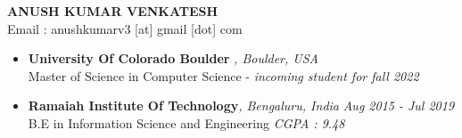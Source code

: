 \documentclass[11pt,a4paper]{article}
\begin{document}
\begin{center}
    \textbf{\huge ANUSH KUMAR VENKATESH}
    \\ Email : anushkumarv3 [at] gmail [dot] com
\end{center}
\colorbox{gray}{}
\vspace{-20pt}
  \begin{itemize}
      \item \textbf{University Of Colorado Boulder} \emph{, Boulder, USA}
      \\ Master of Science in Computer Science - \emph{incoming student for fall 2022}
  \end{itemize}
  \begin{itemize}
    \item \textbf{Ramaiah Institute Of Technology}\emph{, Bengaluru, India} \hfill \textit{Aug 2015 - Jul 2019}
    \\ B.E in Information Science and Engineering \emph{CGPA : 9.48}
  \end{itemize}
\end{document}

